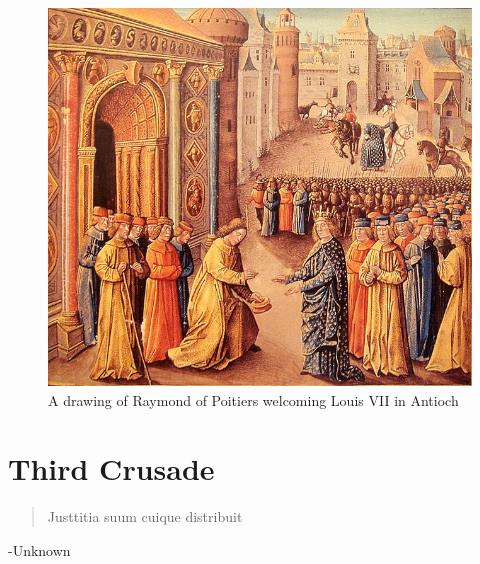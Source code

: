 \documentclass[11pt]{book}
\begin{document}
\begin{figure}
\caption{A drawing of Raymond of Poitiers welcoming Louis VII  in Antioch}
\centering
\label{fig:pictureofsecondcrusade}
\includegraphics[width=\textwidth]{two}
\end{figure}
\chapter{Third Crusade}
\begin{quote}
Justtitia suum cuique distribuit
\end{quote}
-Unknown
\newpage
\end{document}
